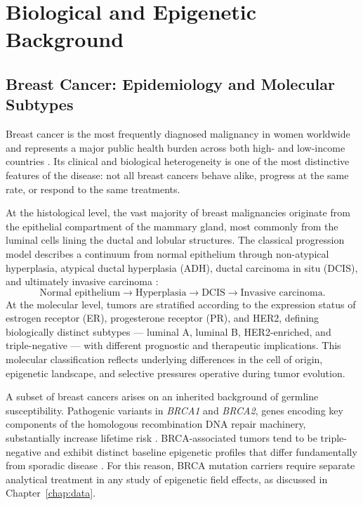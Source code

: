 \chapter{Biological and Epigenetic Background}
\label{chap:biological_background}

\section{Breast Cancer: Epidemiology and Molecular Subtypes}

Breast cancer is the most frequently diagnosed malignancy in women worldwide and
represents a major public health burden across both high- and low-income countries
\cite{Hanahan2011}. Its clinical and biological heterogeneity is one of the most
distinctive features of the disease: not all breast cancers behave alike, progress
at the same rate, or respond to the same treatments.

At the histological level, the vast majority of breast malignancies originate from
the epithelial compartment of the mammary gland, most commonly from the luminal
cells lining the ductal and lobular structures. The classical progression model
describes a continuum from normal epithelium through non-atypical hyperplasia,
atypical ductal hyperplasia (ADH), ductal carcinoma in situ (DCIS), and ultimately
invasive carcinoma \cite{Hanahan2000}:
\[
\text{Normal epithelium} \rightarrow
\text{Hyperplasia} \rightarrow
\text{DCIS} \rightarrow
\text{Invasive carcinoma}.
\]
At the molecular level, tumors are stratified according to the expression status of
estrogen receptor (ER), progesterone receptor (PR), and HER2, defining biologically
distinct subtypes — luminal A, luminal B, HER2-enriched, and triple-negative — with
different prognostic and therapeutic implications. This molecular classification
reflects underlying differences in the cell of origin, epigenetic landscape, and
selective pressures operative during tumor evolution.

A subset of breast cancers arises on an inherited background of germline susceptibility.
Pathogenic variants in \textit{BRCA1} and \textit{BRCA2}, genes encoding key
components of the homologous recombination DNA repair machinery, substantially
increase lifetime risk \cite{NCI_BRCA}. BRCA-associated tumors tend to be
triple-negative and exhibit distinct baseline epigenetic profiles that differ
fundamentally from sporadic disease \cite{Suijkerbuijk2008,Bartlett2022}.
For this reason, BRCA mutation carriers require separate analytical treatment in
any study of epigenetic field effects, as discussed in Chapter~\ref{chap:data}.

